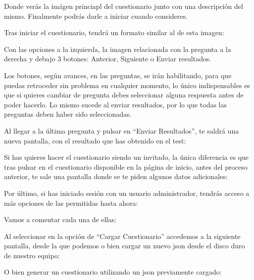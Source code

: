 

Donde verás la imágen princiapl del cuestionario junto con una descripción del mismo. Finalmente podrás darle a iniciar cuando consideres.

Tras iniciar el cuestionario, tendrá un formato similar al de esta imagen:


Con las opciones a la izquierda, la imagen relacionada con la pregunta a la derecha y debajo 3 botones: Anterior, Siguiente o Enviar resultados.

Los botones, según avances, en las preguntas, se irán habilitando, para que puedas retroceder sin problema en cualquier momento, lo único indispensables es que si quieres cambiar de pregunta debes seleccionar alguna respuesta antes de poder hacerlo. Lo mismo sucede al enviar resultados, por lo que todas las preguntas deben haber sido seleccionadas.

Al llegar a la última pregunta y pulsar en ``Enviar Resultados'', te saldrá una nueva pantalla, con el resultado que has obtenido en el test:


Si has quieres hacer el cuestionario siendo un invitado, la única diferencia es que tras pulsar en el cuestionario disponible en la página de inicio, antes del proceso anterior, te sale una pantalla donde se te piden algunos datos adicionales:


Por último, si has iniciado sesión con un usuario administrador, tendrás acceso a más opciones de las permitidas hasta ahora:


Vamos a comentar cada una de ellas:

Al seleccionar en la opción de ``Cargar Cuestionario'' accedemos a la siguiente pantalla, desde la que podemos o bien cargar un nuevo json desde el disco duro de nuestro equipo:


O bien generar un cuestionario utilizando un json previamente cargado:


